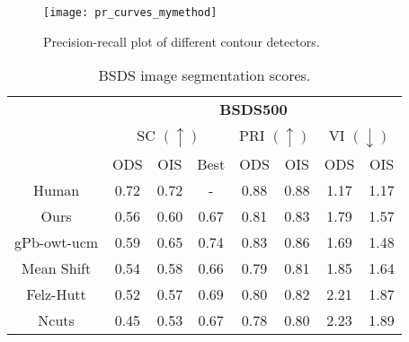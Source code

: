 \begin{figure}[!ht]
	\centering
	\texttt{[image: pr\_curves\_mymethod]}
	\caption{Precision-recall plot of different contour detectors.}\label{fig:pr_curves}
\end{figure}


\begin{table}[]
\centering
\begin{tabular}{c|c|c|c||c|c||c|c|}
\cline{2-8}
                                  & \multicolumn{7}{c|}{\textbf{BSDS500}}                                                                                       \\ \cline{2-8} 
                                  & \multicolumn{3}{c||}{SC $(\uparrow)$} & \multicolumn{2}{c||}{PRI $(\uparrow)$} & \multicolumn{2}{c|}{VI $(\downarrow)$} \\ \cline{2-8} 
                                  & ODS          & OIS          & Best         & ODS               & OIS               & ODS                & OIS               \\ \hline
\multicolumn{1}{|c|}{Human}       & 0.72         & 0.72         & -            & 0.88              & 0.88              & 1.17               & 1.17              \\ \hline
\multicolumn{1}{|c|}{Ours}        & 0.56         & 0.60         & 0.67         & 0.81              & 0.83              & 1.79               & 1.57              \\ \hline
\multicolumn{1}{|c|}{gPb-owt-ucm} & 0.59         & 0.65         & 0.74         & 0.83              & 0.86              & 1.69               & 1.48              \\ \hline
\multicolumn{1}{|c|}{Mean Shift}  & 0.54         & 0.58         & 0.66         & 0.79              & 0.81              & 1.85               & 1.64              \\ \hline
\multicolumn{1}{|c|}{Felz-Hutt}   & 0.52         & 0.57         & 0.69         & 0.80              & 0.82              & 2.21               & 1.87              \\ \hline
\multicolumn{1}{|c|}{Ncuts}       & 0.45         & 0.53         & 0.67         & 0.78              & 0.80              & 2.23               & 1.89              \\ \hline
\end{tabular}
\caption{BSDS image segmentation scores.}
\label{table:segmentation_scores}
\end{table}




